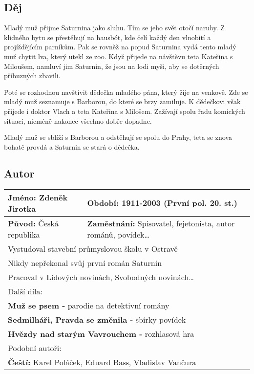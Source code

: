 \subsection*{Děj}
Mladý muž přijme Saturnina jako sluhu.
Tím se jeho svět otočí naruby.
Z klidného bytu se přestěhují na hausbót, kde čelí každý den vlnobití a projíždějícím parníkům.
Pak se rovněž na popud Saturnina vydá tento mladý muž chytit lva, který utekl ze zoo.
Když přijede na návštěvu teta Kateřina s Miloušem, namluví jim Saturnin, že jsou na lodi myši, aby se dotěrných příbuzných zbavili.

Poté se rozhodnou navštívit dědečka mladého pána, který žije na venkově.
Zde se mladý muž seznamuje s Barborou, do které se brzy zamiluje.
K dědečkovi však přijede i doktor Vlach a teta Kateřina s Milošem.
Zažívají spolu řadu komických situací, nicméně nakonec všechno dobře dopadne.

Mladý muž se sblíží s Barborou a odstěhují se spolu do Prahy, teta se znova bohatě provdá a Saturnin se stará o dědečka.

\subsection*{Autor}
\begin{tabularx}{\linewidth}{l|l}
    \textbf{Jméno:} Zdeněk Jirotka  & \textbf{Období:} 1911-2003 (První pol. 20. st.)                          \\
    \hline
    \textbf{Původ:} Česká republika & \textbf{Zaměstnání:} Spisovatel, fejetonista, autor románů, povídek\dots \\
    \hline
    \multicolumn{2}{l}{Vystudoval stavební průmyslovou školu v Ostravě}                                        \\
    \multicolumn{2}{l}{Nikdy nepřekonal svůj první román Saturnin}                                             \\
    \multicolumn{2}{l}{Pracoval v Lidových novinách, Svobodných novinách\dots}                                 \\
    \hline
    \multicolumn{2}{l}{Další díla:}                                                                            \\
    \multicolumn{2}{l}{\textbf{Muž se psem -} parodie na detektivní romány}                                    \\
    \multicolumn{2}{l}{\textbf{Sedmilháři, Pravda se změnila -} sbírky povídek}                                \\
    \multicolumn{2}{l}{\textbf{Hvězdy nad starým Vavrouchem -} rozhlasová hra}                                 \\
    \hline
    \multicolumn{2}{l}{Podobní autoři:}                                                                        \\
    \multicolumn{2}{l}{\textbf{Čeští:} Karel Poláček, Eduard Bass, Vladislav Vančura}                          \\
\end{tabularx}
